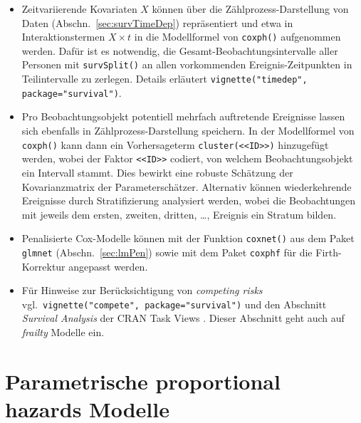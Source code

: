 \begin{itemize}
\item Zeitvariierende Kovariaten $X$ können über die Zählprozess-Darstellung von Daten (Abschn.\ \ref{sec:survTimeDep}) repräsentiert und etwa in Interaktionstermen $X \times t$ in die Modellformel von \lstinline!coxph()! aufgenommen werden. Dafür ist es notwendig, die Gesamt-Beobachtungsintervalle aller Personen mit \lstinline!survSplit()! an allen vorkommenden Ereignis-Zeitpunkten in Teilintervalle zu zerlegen. Details erläutert \lstinline!vignette("timedep", package="survival")!.
\item Pro Beobachtungsobjekt potentiell mehrfach auftretende Ereignisse lassen sich ebenfalls in Zählprozess-Darstellung speichern. In der Modellformel von \lstinline!coxph()! kann dann ein Vorhersageterm \lstinline!cluster(<<ID>>)! hinzugefügt werden, wobei der Faktor \lstinline!<<ID>>! codiert, von welchem Beobachtungsobjekt ein Intervall stammt. Dies bewirkt eine robuste Schätzung der Kovarianzmatrix der Parameterschätzer. Alternativ können wiederkehrende Ereignisse durch Stratifizierung analysiert werden, wobei die Beobachtungen mit jeweils dem ersten, zweiten, dritten, \ldots, Ereignis ein Stratum bilden.
\item Penalisierte Cox-Modelle können mit der Funktion \lstinline!coxnet()! aus dem Paket \lstinline!glmnet! (Abschn.\ \ref{sec:lmPen}) sowie mit dem Paket  \lstinline!coxphf! \cite{Ploner2013} für die Firth-Korrektur angepasst werden.
\item Für Hinweise zur Berücksichtigung von \emph{competing risks} \cite{Beyersmann2012} vgl.\ \lstinline!vignette("compete", package="survival")! und den Abschnitt \emph{Survival Analysis} der CRAN Task Views \cite{CRANtvSurvival}. Dieser Abschnitt geht auch auf \emph{frailty} Modelle ein.
\end{itemize}

\section{Parametrische proportional hazards Modelle}
\label{sec:survParam}

